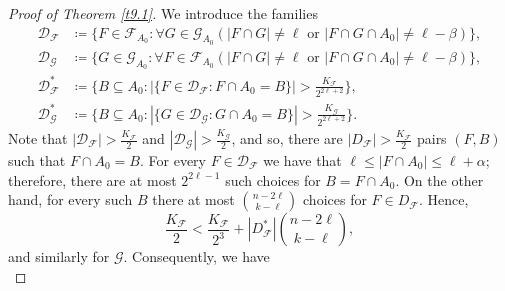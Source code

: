 \documentclass[10pt]{amsart}
\theoremstyle{remark}
\newcommand{\mik}{\leqslant}
\newcommand{\Fcal}{\mathcal{F}}
\newcommand{\Gcal}{\mathcal{G}}
\newcommand{\Dcal}{\mathcal{D}}
\begin{document}
\begin{proof}[Proof of Theorem \emph{\ref{t9.1}}]
We introduce the families
\begin{align*}
\Dcal_{\Fcal} & \coloneqq \big\{F\in\Fcal_{A_0}: \forall G\in\Gcal_{A_0}
\left(|F\cap G|\neq \ell \text{ or } |F\cap G\cap A_0|\neq \ell-\beta\right)\big\}, \\
\Dcal_{\Gcal} & \coloneqq \big\{G\in\Gcal_{A_0}: \forall F\in\Fcal_{A_0}
\left(|F\cap G|\neq \ell \text{ or } |F\cap G\cap A_0|\neq \ell-\beta\right)\big\}, \\
\Dcal_{\Fcal}^* & \coloneqq \Big\{B\subseteq A_0:
|\{F\in\Dcal_{\Fcal}:F\cap A_0=B\}|>\frac{K_{\Fcal}}{2^{2\ell+2}}\Big\}, \\
\Dcal_{\Gcal}^* & \coloneqq \Big\{B\subseteq A_0:
|\{G\in\Dcal_{\Gcal}: G\cap A_0=B\}|>\frac{K_{\Gcal}}{2^{2\ell+2}}\Big\}.
\end{align*}
Note that $|\Dcal_{\Fcal}|>\frac{K_{\Fcal}}{2}$ and $|\Dcal_{\Gcal}|>\frac{K_{\Gcal}}{2}$, and so,
there are $|D_{\Fcal}|>\frac{K_{\Fcal}}{2}$ pairs $(F,B)$ such that $F\cap A_0=B$.
For every $F\in\Dcal_{\Fcal}$ we have that $\ell \mik |F\cap A_0|\mik \ell+\alpha$; therefore,
there are at most $2^{2\ell-1}$ such choices for $B=F\cap A_0$. On the other hand,
for every such $B$ there at most $\binom{n-2\ell}{k-\ell}$ choices for $F\in D_{\Fcal}$. Hence,
\begin{equation}
\frac{K_{\Fcal}}{2}< \frac{K_{\Fcal}}{2^3}+|D_{\Fcal}^*|\binom{n-2\ell}{k-\ell},
\end{equation}
and similarly for $\mathcal{G}$. Consequently, we have
\begin{equation} \label{e9.18}

\end{equation}
\end{proof}
\end{document}
